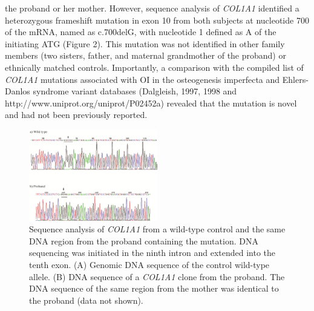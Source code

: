                     the proband or her mother. However, sequence analysis of \textit{COL1A1}
                    identified a heterozygous frameshift mutation in exon 10 from both subjects at
                    nucleotide 700 of the mRNA, named as c.700delG, with nucleotide 1 defined as A
                    of the initiating ATG (Figure 2). This
                    mutation was not identified in other family members (two sisters, father, and
                    maternal grandmother of the proband) or ethnically matched controls.
                    Importantly, a comparison with the compiled list of \textit{COL1A1}
                    mutations associated with OI in the osteogenesis imperfecta and Ehlers-Danlos
                    syndrome variant databases (Dalgleish,
                        1997, 1998 and http://www.uniprot.org/uniprot/P02452a) revealed that the
                    mutation is novel and had not been previously reported.
\begin{figure}[p]
\centering
\includegraphics[width=0.5\textwidth]{1415-4757-gmb-38-1-1-gf02.png}
\caption{Sequence analysis of \textit{COL1A1} from a wild-type control
                            and the same DNA region from the proband containing the mutation. DNA
                            sequencing was initiated in the ninth intron and extended into the tenth
                            exon. (A) Genomic DNA sequence of the control wild-type allele. (B) DNA
                            sequence of a \textit{COL1A1} clone from the proband. The DNA
                            sequence of the same region from the mother was identical to the proband
                            (data not shown).}
\label{Figure 2}
\end{figure}

